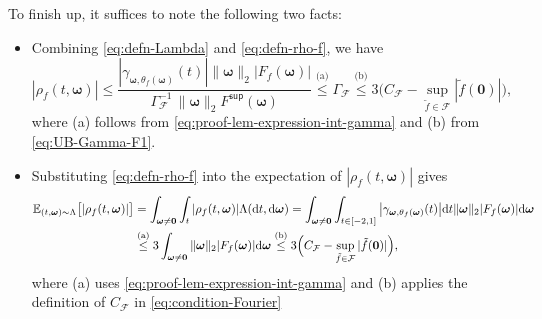 \documentclass[english]{article}
\begin{document}
To finish up, it suffices to note the following two facts: 
\begin{itemize}
\item
Combining \eqref{eq:defn-Lambda} and \eqref{eq:defn-rho-f}, we have
$$
|\rho_f(t, {\bm \omega})|\le 
\frac{|\gamma_{{\bm \omega}, \theta_f({\bm \omega})}(t)|\|{\bm \omega}\|_2|F_f({\bm \omega})|}{\Gamma_{\mathcal{F}}^{-1}\,\|{\bm \omega}\|_2F^{\mathsf{sup}}({\bm \omega})}
\overset{\text{(a)}}{\le} \Gamma_{\mathcal{F}}\overset{\text{(b)}}{\le} 3\Big(C_{\mathcal{F}} - \sup_{\tilde{f}\in\mathcal{F}}|\tilde{f}({\bm 0})| \Big),
$$
where (a) follows from \eqref{eq:proof-lem-expression-int-gamma} and (b) from \eqref{eq:UB-Gamma-F1}.
\item Substituting \eqref{eq:defn-rho-f} into the expectation of $|\rho_f(t, \bm{\omega})|$ gives
\begin{align*}
\mathbb{E}_{(t, \bm{\omega}) \sim \Lambda}\big[|\rho_f(t, \bm{\omega})|\big]  &=\int_{{\bm \omega}\ne \bm{0}}\int_t |\rho_f(t, {\bm \omega})|\Lambda(\mathrm{d}t, \mathrm{d}{\bm \omega})
= \int_{{\bm \omega}\ne \bm{0}}\int_{t\in[-2, 1]} \big|\gamma_{{\bm \omega}, \theta_f({\bm \omega})}(t)\big|\mathrm{d}t\|{\bm \omega}\|_2|
F_f({\bm \omega})|\mathrm{d}{\bm \omega}
\notag\\
&\overset{\text{(a)}}{\le} 3\int_{{\bm \omega}\ne \bm{0}}\|{\bm \omega}\|_2|
F_f({\bm \omega})|\mathrm{d}{\bm \omega}
\overset{\text{(b)}}{\le} 3\Big(C_{\mathcal{F}} - \sup_{\tilde{f}\in\mathcal{F}}|\tilde{f}({\bm 0})|\Big),
\end{align*}
where (a) uses \eqref{eq:proof-lem-expression-int-gamma} and (b) applies the definition of $C_{\mathcal{F}}$ in \eqref{eq:condition-Fourier}
\end{itemize}
\end{document}
